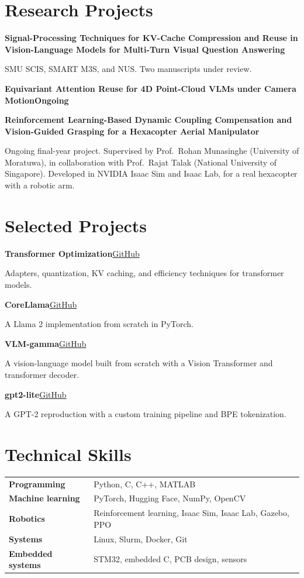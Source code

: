 \documentclass[11pt,a4paper]{article}
\newcommand{\entry}[3]{%
  {\raggedright\bfseries #1\hfill{\mdseries\small #2}\par}
  \if\relax\detokenize{#3}\relax\else{\itshape\color{muted}#3}\par\fi
}
\newcommand{\project}[3]{%
  \textbf{#1}\hfill{\small\href{#2}{GitHub}}\par
  {\color{muted}#3}\par
}
\begin{document}
\section{Research Projects}
\entry{Signal-Processing Techniques for KV-Cache Compression and Reuse in Vision-Language Models for Multi-Turn Visual Question Answering}{}{}
{\color{muted}SMU SCIS, SMART M3S, and NUS. Two manuscripts under review.}\par
\vspace{5pt}
\entry{Equivariant Attention Reuse for 4D Point-Cloud VLMs under Camera Motion}{Ongoing}{}
\vspace{5pt}
\entry{Reinforcement Learning-Based Dynamic Coupling Compensation and Vision-Guided Grasping for a Hexacopter Aerial Manipulator}{}{}
{\color{muted}Ongoing final-year project. Supervised by Prof.\ Rohan Munasinghe (University of Moratuwa), in collaboration with Prof.\ Rajat Talak (National University of Singapore). Developed in NVIDIA Isaac Sim and Isaac Lab, for a real hexacopter with a robotic arm.}\par

\section{Selected Projects}
\project{Transformer Optimization}{https://github.com/samitha278/transformer-optim}{Adapters, quantization, KV caching, and efficiency techniques for transformer models.}
\vspace{2pt}
\project{CoreLlama}{https://github.com/samitha278/CoreLlama}{A Llama 2 implementation from scratch in PyTorch.}
\vspace{2pt}
\project{VLM-gamma}{https://github.com/samitha278/VLM-gamma}{A vision-language model built from scratch with a Vision Transformer and transformer decoder.}
\vspace{2pt}
\project{gpt2-lite}{https://github.com/samitha278/gpt2-lite}{A GPT-2 reproduction with a custom training pipeline and BPE tokenization.}

\section{Technical Skills}
\begin{tabularx}{\textwidth}{@{}>{\raggedright\bfseries}p{} X@{}}
Programming & Python, C, C++, MATLAB \\
Machine learning & PyTorch, Hugging Face, NumPy, OpenCV \\
Robotics & Reinforcement learning, Isaac Sim, Isaac Lab, Gazebo, PPO \\
Systems & Linux, Slurm, Docker, Git \\
Embedded systems & STM32, embedded C, PCB design, sensors \\
\end{tabularx}
\end{document}
